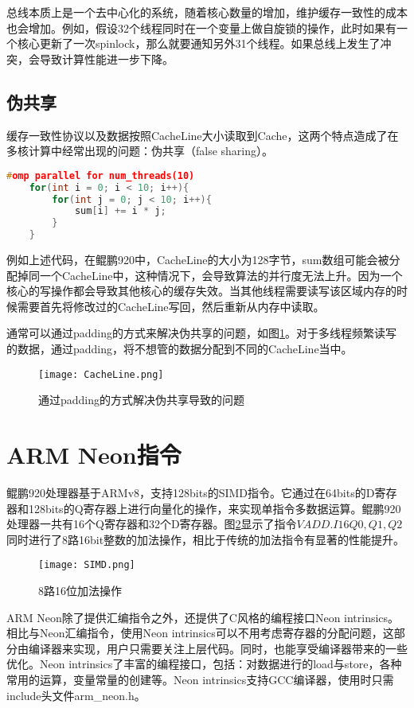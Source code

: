 总线本质上是一个去中心化的系统，随着核心数量的增加，维护缓存一致性的成本也会增加。例如，假设32个线程同时在一个变量上做自旋锁的操作，此时如果有一个核心更新了一次spinlock，那么就要通知另外31个线程。如果总线上发生了冲突，会导致计算性能进一步下降。

\subsection{伪共享}
缓存一致性协议以及数据按照CacheLine大小读取到Cache，这两个特点造成了在多核计算中经常出现的问题：伪共享（false sharing）。

\begin{lstlisting}[language=c++]
    #omp parallel for num_threads(10)
    for(int i = 0; i < 10; i++){
        for(int j = 0; j < 10; i++){
            sum[i] += i * j;
        }
    }
\end{lstlisting}

例如上述代码，在鲲鹏920中，CacheLine的大小为128字节，sum数组可能会被分配掉同一个CacheLine中，这种情况下，会导致算法的并行度无法上升。因为一个核心的写操作都会导致其他核心的缓存失效。当其他线程需要读写该区域内存的时候需要首先将修改过的CacheLine写回，然后重新从内存中读取。

通常可以通过padding的方式来解决伪共享的问题，如图\ref{通过padding的方式解决伪共享导致的问题}。对于多线程频繁读写的数据，通过padding，将不想管的数据分配到不同的CacheLine当中。

\begin{figure}[htbp]
    \centering
    \texttt{[image: CacheLine.png]}
    \caption{通过padding的方式解决伪共享导致的问题}
    \label{通过padding的方式解决伪共享导致的问题}
\end{figure}

\section{ARM Neon指令}

鲲鹏920处理器基于ARMv8，支持128bits的SIMD指令。它通过在64bits的D寄存器和128bits的Q寄存器上进行向量化的操作，来实现单指令多数据运算。鲲鹏920处理器一共有16个Q寄存器和32个D寄存器。图\ref{SIMD}显示了指令$VADD.I16 Q0, Q1, Q2$同时进行了8路16bit整数的加法操作，相比于传统的加法指令有显著的性能提升。
\begin{figure}[htbp]
    \centering
    \texttt{[image: SIMD.png]}
    \caption{8路16位加法操作}
    \label{SIMD}
\end{figure}
ARM Neon除了提供汇编指令之外，还提供了C风格的编程接口Neon intrinsics。相比与Neon汇编指令，使用Neon intrinsics可以不用考虑寄存器的分配问题，这部分由编译器来实现，用户只需要关注上层代码。同时，也能享受编译器带来的一些优化。Neon intrinsics了丰富的编程接口，包括：对数据进行的load与store，各种常用的运算，变量常量的创建等。Neon intrinsics支持GCC编译器，使用时只需include头文件arm\_neon.h。

